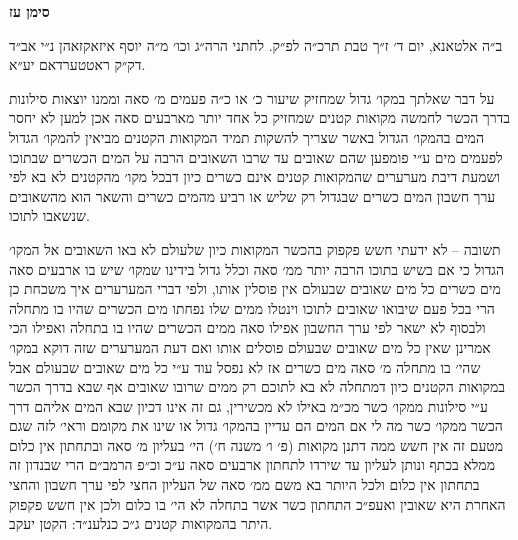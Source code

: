 \documentclass[12pt, openany]{book}
\newcommand{\chapname}{}
\newcommand{\newchap}[1]{
	\addcontentsline{toc}{chapter}{#1}
	\renewcommand{\chapname}{#1}
		\begin{center}
			\textbf{%
\fontsize{16pt}{16pt}\selectfont
				#1}
		\end{center}
}
\begin{document}
\newchap{סימן עז}
\begin{multicols}{2}
ב״ה אלטאנא, יום ד׳ ז״ך טבת תרכ״ה לפ״ק. לחתני הרה״ג וכו׳ מ״ה יוסף איזאקזאהן נ״י אב״ד דק״ק ראטטערדאם יע״א.\\\vspace{0pt}

על דבר שאלתך במקו׳ גדול שמחזיק שיעור כ׳ או כ״ה פעמים מ׳ סאה וממנו יוצאות סילונות בדרך הכשר לחמשה מקואות קטנים שמחזיק כל אחד יותר מארבעים סאה אכן למען לא יחסר המים בהמקו׳ הגדול באשר שצריך להשקות תמיד המקואות הקטנים מביאין להמקו׳ הגדול לפעמים מים ע״י פומפען שהם שאובים עד שרבו השאובים הרבה על המים הכשרים שבתוכו ושמעת דיבת מערערים שהמקואות קטנים אינם כשרים כיון דבכל מקו׳ מהקטנים לא בא לפי ערך חשבון המים כשרים שבגדול רק שליש או רביע מהמים כשרים והשאר הוא מהשאובים שנשאבו לתוכו.\\\vspace{0pt}

תשובה – לא ידעתי חשש פקפוק בהכשר המקואות כיון שלעולם לא באו השאובים אל המקו׳ הגדול כי אם בשיש בתוכו הרבה יותר ממ׳ סאה וכלל גדול בידינו שמקו׳ שיש בו ארבעים סאה מים כשרים כל מים שאובים שבעולם אין פוסלין אותו, ולפי דברי המערערים איך משכחת כן הרי בכל פעם שיבואו שאובים לתוכו וינטלו ממים שלו נפחתו מים הכשרים שהיו בו מתחלה ולבסוף לא ישאר לפי ערך החשבון אפילו סאה ממים הכשרים שהיו בו בתחלה ואפילו הכי אמרינן שאין כל מים שאובים שבעולם פוסלים אותו ואם דעת המערערים שזה דוקא במקו׳ שהי׳ בו מתחלה מ׳ סאה מים כשרים אז לא נפסל עוד ע״י כל מים שאובים שבעולם אבל במקואות הקטנים כיון דמתחלה לא בא לתוכם רק ממים שרובו שאובים אף שבא בדרך הכשר ע״י סילונות ממקו׳ כשר מכ״מ באילו לא מכשירין, גם זה אינו דכיון שבא המים אליהם דרך הכשר ממקו׳ כשר מה לי אם המים הם עדיין בהמקו׳ גדול או שינו את מקומם וראי׳ לזה שגם מטעם זה אין חשש ממה דתנן מקואות (פ׳ ו׳ משנה ח׳) הי׳ בעליון מ׳ סאה ובתחתון אין כלום ממלא בכתף ונותן לעליון עד שירדו לתחתון ארבעים סאה ע״כ וכ״פ הרמב״ם הרי שבנדון זה בתחתון אין כלום ולכל היותר בא משם ממ׳ סאה של העליון החצי לפי ערך חשבון והחצי האחרת היא שאובין ואעפ״כ התחתון כשר אשר בתחלה לא הי׳ בו כלום ולכן אין חשש פקפוק היתר בהמקואות קטנים ג״כ כנלענ״ד: הקטן יעקב.\\\vspace{0pt}

\end{multicols}\newpage
\end{document}
